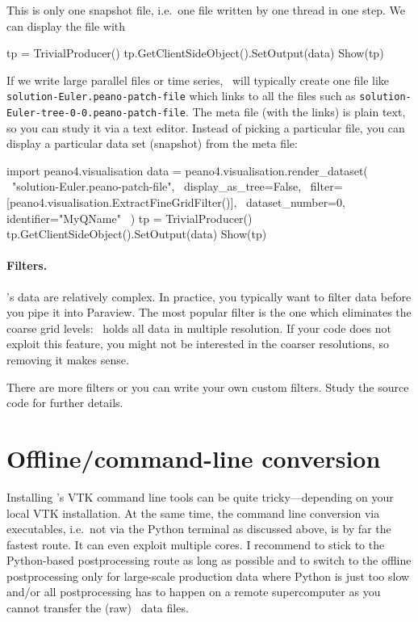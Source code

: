 \noindent
This is only one snapshot file, i.e.~one file written by one thread in one step. 
We can display the file with
\begin{code}
tp = TrivialProducer()
tp.GetClientSideObject().SetOutput(data)
Show(tp)
\end{code}


\noindent
If we write large parallel files or time series, \Peano\ will typically 
create one file like \texttt{solution-Euler.peano-patch-file} which links
to all the files such as \linebreak \texttt{solution-Euler-tree-0-0.peano-patch-file}.
The meta file (with the links) is plain text, so you can study it via a 
text editor.
Instead of picking a particular file, 
you can display a particular data set (snapshot) from the meta file:
\begin{code}
import peano4.visualisation  
data = peano4.visualisation.render_dataset( \
  "solution-Euler.peano-patch-file", \
  display_as_tree=False, \
  filter=[peano4.visualisation.ExtractFineGridFilter()], \
  dataset_number=0, identifier="MyQName" \
)
tp = TrivialProducer()
tp.GetClientSideObject().SetOutput(data)
Show(tp)
\end{code}


\paragraph{Filters.}
%
%
%
\Peano's data are relatively complex.
In practice, you typically want to filter data before you pipe it into Paraview.
The most popular filter is the one which eliminates the coarse grid levels:
\Peano\ holds all data in multiple resolution.
If your code does not exploit this feature, you might not be interested in the 
coarser resolutions, so removing it makes sense.


There are more filters or you can write your own custom filters.
Study the source code for further details.



\section{Offline/command-line conversion}
\label{section:postprocessing:command-line}


Installing \Peano's VTK command line tools can be quite tricky---depending on your
local VTK installation.
At the same time, the command line conversion via executables, i.e.~not via the 
Python terminal as discussed above, is by far the fastest route.
It  can even exploit multiple cores.
I recommend to stick to the Python-based postprocessing route as long as possible 
and to switch to the offline postprocessing only for large-scale production data
where Python is just too slow and/or all postprocessing has to happen on a remote 
supercomputer as you cannot transfer the (raw) \Peano\ data files.


